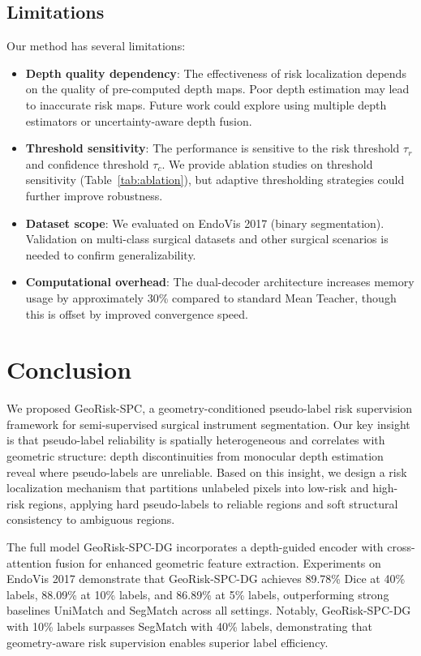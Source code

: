 \documentclass[conference]{IEEEtran}
\begin{document}
\subsection{Limitations}
Our method has several limitations:
\begin{itemize}
\item \textbf{Depth quality dependency}: The effectiveness of risk localization depends on the quality of pre-computed depth maps. Poor depth estimation may lead to inaccurate risk maps. Future work could explore using multiple depth estimators or uncertainty-aware depth fusion.
\item \textbf{Threshold sensitivity}: The performance is sensitive to the risk threshold $\tau_r$ and confidence threshold $\tau_c$. We provide ablation studies on threshold sensitivity (Table~\ref{tab:ablation}), but adaptive thresholding strategies could further improve robustness.
\item \textbf{Dataset scope}: We evaluated on EndoVis 2017 (binary segmentation). Validation on multi-class surgical datasets and other surgical scenarios is needed to confirm generalizability.
\item \textbf{Computational overhead}: The dual-decoder architecture increases memory usage by approximately 30\% compared to standard Mean Teacher, though this is offset by improved convergence speed.
\end{itemize}

\section{Conclusion}
We proposed GeoRisk-SPC, a geometry-conditioned pseudo-label risk supervision framework for semi-supervised surgical instrument segmentation. Our key insight is that pseudo-label reliability is spatially heterogeneous and correlates with geometric structure: depth discontinuities from monocular depth estimation reveal where pseudo-labels are unreliable. Based on this insight, we design a risk localization mechanism that partitions unlabeled pixels into low-risk and high-risk regions, applying hard pseudo-labels to reliable regions and soft structural consistency to ambiguous regions.

The full model GeoRisk-SPC-DG incorporates a depth-guided encoder with cross-attention fusion for enhanced geometric feature extraction. Experiments on EndoVis 2017 demonstrate that GeoRisk-SPC-DG achieves 89.78\% Dice at 40\% labels, 88.09\% at 10\% labels, and 86.89\% at 5\% labels, outperforming strong baselines UniMatch and SegMatch across all settings. Notably, GeoRisk-SPC-DG with 10\% labels surpasses SegMatch with 40\% labels, demonstrating that geometry-aware risk supervision enables superior label efficiency.
\end{document}
